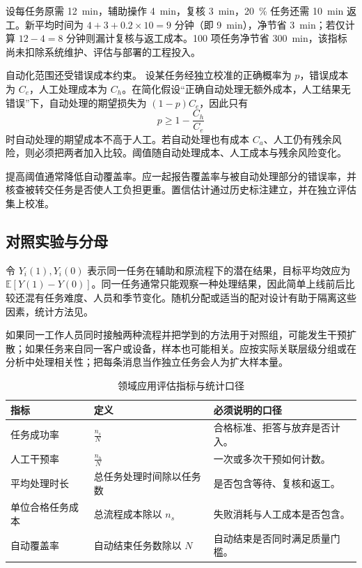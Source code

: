 \documentclass[../textbook.tex]{subfiles}
\begin{document}
\begin{example}[人工复核与返工成本]
设每任务原需 \qty{12}{\minute}，辅助操作 \qty{4}{\minute}，复核 \qty{3}{\minute}，\qty{20}{\percent} 任务还需 \qty{10}{\minute} 返工。新平均时间为 $4+3+0.2\times10=9$ 分钟（即 \qty{9}{\minute}），净节省 \qty{3}{\minute}；若仅计算 $12-4=8$ 分钟则漏计复核与返工成本。100 项任务净节省 \qty{300}{\minute}，该指标尚未扣除系统维护、评估与部署的工程投入。
\end{example}

自动化范围还受错误成本约束。
设某任务经独立校准的正确概率为 $p$，错误成本为 $C_e$，人工处理成本为 $C_h$。在简化假设“正确自动处理无额外成本，人工结果无错误”下，自动处理的期望损失为 $(1-p)C_e$，因此只有
\begin{equation}
 p\ge 1-\frac{C_h}{C_e}
\end{equation}
时自动处理的期望成本不高于人工。若自动处理也有成本 $C_a$、人工仍有残余风险，则必须把两者加入比较。阈值随自动处理成本、人工成本与残余风险变化。

提高阈值通常降低自动覆盖率。应一起报告覆盖率与被自动处理部分的错误率，并核查被转交任务是否使人工负担更重。置信估计通过历史标注建立，并在独立评估集上校准。

\subsection{对照实验与分母}
令 $Y_i(1),Y_i(0)$ 表示同一任务在辅助和原流程下的潜在结果，目标平均效应为 $\mathbb E[Y(1)-Y(0)]$。同一任务通常只能观察一种处理结果，因此简单上线前后比较还混有任务难度、人员和季节变化。随机分配或适当的配对设计有助于隔离这些因素，统计方法见。

如果同一工作人员同时接触两种流程并把学到的方法用于对照组，可能发生干预扩散；如果任务来自同一客户或设备，样本也可能相关。应按实际关联层级分组或在分析中处理相关性；把每条消息当作独立任务会人为扩大样本量。

\begin{table}[htbp]
\centering
\caption{领域应用评估指标与统计口径}
\label{tab:domain-applications-metrics}
\begin{tabularx}{\linewidth}{@{}p{.28\linewidth}p{.31\linewidth}X@{}}
\toprule
指标 & 定义 & 必须说明的口径\\
\midrule
任务成功率 & $\frac{n_s}{N}$ & 合格标准、拒答与放弃是否计入。\\
人工干预率 & $\frac{n_h}{N}$ & 一次或多次干预如何计数。\\
平均处理时长 & 总任务处理时间除以任务数 & 是否包含等待、复核和返工。\\
单位合格任务成本 & 总流程成本除以 $n_s$ & 失败消耗与人工成本是否包含。\\
自动覆盖率 & 自动结束任务数除以 $N$ & 自动结束是否同时满足质量门槛。\\
\bottomrule
\end{tabularx}
\end{table}
\end{document}
